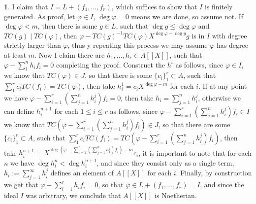 \documentclass[11pt]{article}
\theoremstyle{definition}
\newtheorem{pb}{}
\newcommand{\set}[1]{\{#1\}}
\begin{document}
\begin{pb}
        I claim that \(I = L + (f_1,\hdots,f_r)\), which suffices to show that \(I\) is finitely generated. As proof, let \(\varphi \in I\), \(\deg \varphi = 0\) means we are done, so assume not. If \(\deg \varphi < m\), then there is some \(g \in L\), such that \(\deg g \leq \deg \varphi\) and \(TC(g) \mid TC(\varphi)\), then \(\varphi - TC(g)^{-1}TC(\varphi)X^{\deg \varphi - \deg g}g\) is in \(I\) with degree strictly larger than \(\varphi\), thus y repeating this process we may assume \(\varphi\) has degree at least \(m\). Now I claim there are \(h_1,\hdots,h_r \in A[[X]]\), such that \(\varphi - \sum_1^n h_if_i = 0\) completing the proof. Construct the \(h^i\) as follows, since \(\varphi \in I\), we know that \(TC(\varphi) \in J\), so that there is some \(\set{c_i}_1^r \subset A\), such that \(\sum_1^r c_i TC(f_i) = TC(\varphi)\), then take \(h_i^1 = c_i X^{\deg \varphi - m}\) for each \(i\). If at any point we have \(\varphi - \sum_{i = 1}^r \left(\sum_{j=1}^n h_i^j\right)f_i = 0\), then take \(h_i = \sum_{j=1}^n h_i^j\), otherwise we can define \(h_i^{n+1}\) for each \(1 \leq i \leq r\) as follows, since \(\varphi - \sum_{i = 1}^r \left(\sum_{j=1}^n h_i^j\right)f_i \in I\) we know that \(TC\left(\varphi - \sum_{i = 1}^r \left(\sum_{j=1}^n h_i^j\right)f_i\right) \in J\), so that there are some \(\set{c_i}_1^r \subset A\), such that \(\sum_1^r c_iTC(f_i) = TC\left(\varphi - \sum_{i = 1}^r \left(\sum_{j=1}^n h_i^j\right)f_i\right)\), then take \(h_i^{n+1} = X^{\deg \left(\varphi - \sum_{i = 1}^r \left(\sum_{j=1}^n h_i^j\right)f_i\right) - m}c_i\), it is important to note that for each \(n\) we have \(\deg h_i^n < \deg h_i^{n+1}\), and since they consist only as a single term, \(h_i := \sum_{j=1}^\infty h_i^j\) defines an element of \(A[[X]]\) for each \(i\). Finally, by construction we get that \(\varphi - \sum_{i=1}^r h_if_i = 0\), so that \(\varphi \in L + (f_1,\hdots,f_r) = I\), and since the ideal \(I\) was arbitrary, we conclude that \(A[[X]]\) is Noetherian.
    \end{pb}
\end{document}

